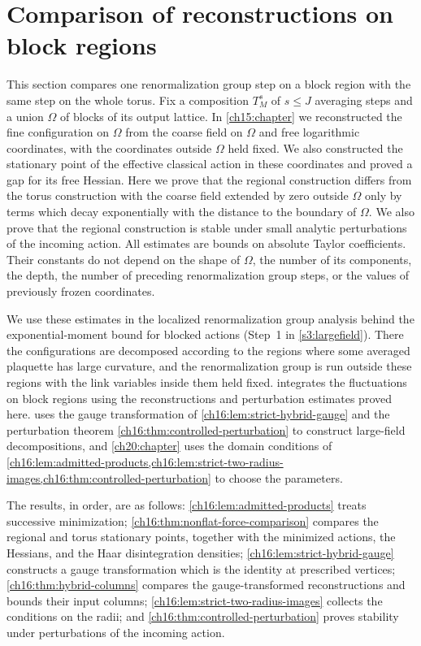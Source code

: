 \chapter{Comparison of reconstructions on block regions}\label{ch16:chapter}

This section compares one renormalization group step on a block region with the same step on the whole torus. Fix a composition $T_M^s$ of $s\le J$ averaging steps and a union $\Omega$ of blocks of its output lattice. In \cref{ch15:chapter} we reconstructed the fine configuration on $\Omega$ from the coarse field on $\Omega$ and free logarithmic coordinates, with the coordinates outside $\Omega$ held fixed. We also constructed the stationary point of the effective classical action in these coordinates and proved a gap for its free Hessian. Here we prove that the regional construction differs from the torus construction with the coarse field extended by zero outside $\Omega$ only by terms which decay exponentially with the distance to the boundary of $\Omega$. We also prove that the regional construction is stable under small analytic perturbations of the incoming action. All estimates are bounds on absolute Taylor coefficients. Their constants do not depend on the shape of $\Omega$, the number of its components, the depth, the number of preceding renormalization group steps, or the values of previously frozen coordinates.

We use these estimates in the localized renormalization group analysis behind the exponential-moment bound for blocked actions (Step~1 in \cref{s3:largefield}). There the configurations are decomposed according to the regions where some averaged plaquette has large curvature, and the renormalization group is run outside these regions with the link variables inside them held fixed.  integrates the fluctuations on block regions using the reconstructions and perturbation estimates proved here.  uses the gauge transformation of \cref{ch16:lem:strict-hybrid-gauge} and the perturbation theorem \cref{ch16:thm:controlled-perturbation} to construct large-field decompositions, and \cref{ch20:chapter} uses the domain conditions of \cref{ch16:lem:admitted-products,ch16:lem:strict-two-radius-images,ch16:thm:controlled-perturbation} to choose the parameters.

The results, in order, are as follows: \cref{ch16:lem:admitted-products} treats successive minimization; \cref{ch16:thm:nonflat-force-comparison} compares the regional and torus stationary points, together with the minimized actions, the Hessians, and the Haar disintegration densities; \cref{ch16:lem:strict-hybrid-gauge} constructs a gauge transformation which is the identity at prescribed vertices; \cref{ch16:thm:hybrid-columns} compares the gauge-transformed reconstructions and bounds their input columns; \cref{ch16:lem:strict-two-radius-images} collects the conditions on the radii; and \cref{ch16:thm:controlled-perturbation} proves stability under perturbations of the incoming action.

